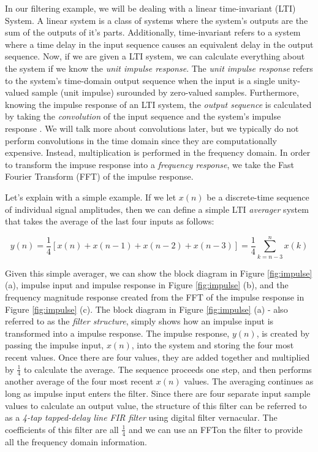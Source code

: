  In our filtering example, we will be dealing with a linear
 time-invariant (LTI) System. A linear system is a class of
 systems where the system's outputs are the sum of the outputs of
 it's parts. Additionally, time-invariant refers to a system
 where a time delay in the input sequence causes an equivalent
 delay in the output sequence. Now, if we are given a LTI system,
 we can calculate everything about the system if we know the
 \textit{unit impulse response}. The \textit{unit impulse
 response} refers to the system's time-domain output sequence
 when the input is a single unity-valued sample (unit impulse)
 surounded by zero-valued samples. Furthermore, knowing the
 impulse response of an LTI system, the \textit{output sequence}
 is calculated by taking the \textit{convolution} of the input
 sequence and the system's impulse response \cite{lyons:intro}.
 We will talk more about convolutions later, but we typically do
 not perform convolutions in the time domain since they are
 computationally expensive. Instead, multiplication is performed
 in the frequency domain. In order to transform the impuse
 response into a \textit{frequency response}, we take the Fast
 Fourier Transform (FFT) of the impulse
 response\cite{lyons:intro}.

Let's explain with a simple example. If we let $x(n)$ be a
discrete-time sequence of individual signal amplitudes, then we
can define a simple LTI \textit{averager} system that takes the
average of the last four inputs as follows:

$$y(n) = \frac{1}{4} \left[ x(n)+x(n-1)+x(n-2)+x(n-3)\right] =  \frac{1}{4}\sum_{k=n-3}^{n} x(k)$$    

Given this simple averager, we can show the block diagram in
Figure \ref{fig:impulse} (a), impulse input and impulse response
in Figure \ref{fig:impulse} (b), and the frequency magnitude
response created from the FFT of the impulse response in Figure
\ref{fig:impulse} (c). The block diagram in Figure
\ref{fig:impulse} (a) - also referred to as the \textit{filter
structure}, simply shows how an impulse input is transformed into
a impulse response. The impulse response, $y(n)$, is created by
passing the impulse input, $x(n)$, into the system and storing
the four most recent values. Once there are four values, they are
added together and multiplied by $\frac{1}{4}$ to calculate the
average. The sequence proceeds one step, and then performs
another average of the four most recent $x(n)$ values. The
averaging continues as long as impulse input enters the filter.
Since there are four separate input sample values to calculate an
output value, the structure of this filter can be referred to as
a \textit{4-tap tapped-delay line FIR filter} using digital
filter vernacular. The coefficients of this filter are all
$\frac{1}{4}$ and we can use an FFTon the filter to provide all
the frequency domain information.


